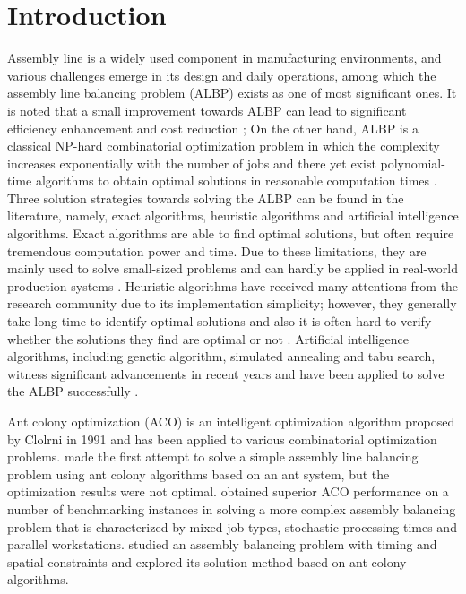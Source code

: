 
\section{Introduction}
Assembly line is a widely used component in manufacturing environments, and various challenges emerge in its design and daily operations, among which the assembly line balancing problem (ALBP) exists as one of most significant ones.
It is noted that a small improvement towards ALBP can lead to significant efficiency enhancement and cost reduction \citep{salveson1};
On the other hand, ALBP is a classical NP-hard combinatorial optimization problem in which the complexity increases exponentially with the number of jobs and there yet exist polynomial-time algorithms to obtain optimal solutions in reasonable computation times \citep{kilincci2}.
Three solution strategies towards solving the ALBP can be found in the literature, namely, exact algorithms, heuristic algorithms and artificial intelligence algorithms.
Exact algorithms are able to find optimal solutions, but often require tremendous computation power and time.
Due to these limitations, they are mainly used to solve small-sized problems and can hardly be applied in real-world production systems \citep{scholl3, peeter4}.
Heuristic algorithms have received many attentions from the research community due to its implementation simplicity; however, they generally take long time to identify optimal solutions and also it is often hard to verify whether the solutions they find are optimal or not \citep{ponnambalam5}.
Artificial intelligence algorithms, including genetic algorithm, simulated annealing and tabu search, witness significant advancements in recent years and have been applied to solve the ALBP successfully \citep{azcan6, azcan7}.

Ant colony optimization (ACO) is an intelligent optimization algorithm proposed by Clolrni \citep{inproceedings8} in 1991 and has been applied to various combinatorial optimization problems.
\citet{bautista9} made the first attempt to solve a simple assembly line balancing problem using ant colony algorithms based on an ant system, but the optimization results were not optimal.
\citet{patrick10} obtained superior ACO performance on a number of benchmarking instances in solving a more complex assembly balancing problem that is characterized by mixed job types, stochastic processing times and parallel workstations.
\citet{bautista11} studied an assembly balancing problem with timing and spatial constraints and explored its solution method based on ant colony algorithms.

